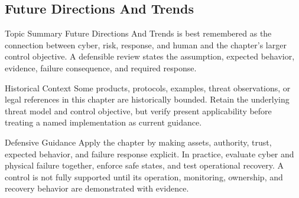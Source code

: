 \documentclass[11pt,letterpaper]{article}
\begin{document}
\subsection*{Future Directions And Trends}
\begin{CornellNotesTable}
\end{CornellNotesTable}
\begin{CornellSummaryBox}{Topic Summary}
Future Directions And Trends is best remembered as the connection between cyber, risk, response, and human and the chapter's larger control objective. A defensible review states the assumption, expected behavior, evidence, failure consequence, and required response.
\end{CornellSummaryBox}
\begin{CornellWarningBox}{Historical Context}
Some products, protocols, examples, threat observations, or legal references in this chapter are historically bounded. Retain the underlying threat model and control objective, but verify present applicability before treating a named implementation as current guidance.
\end{CornellWarningBox}
\begin{CornellOverviewBox}{Defensive Guidance}
Apply the chapter by making assets, authority, trust, expected behavior, and failure response explicit. In practice, evaluate cyber and physical failure together, enforce safe states, and test operational recovery. A control is not fully supported until its operation, monitoring, ownership, and recovery behavior are demonstrated with evidence.
\end{CornellOverviewBox}
\end{document}
